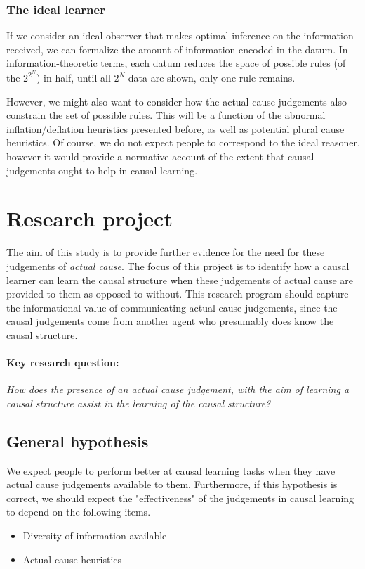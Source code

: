 \documentclass[10pt,letterpaper]{article}
\begin{document}
\subsubsection*{The ideal learner}

If we consider an ideal observer that makes optimal inference on the
information received, we can formalize the amount of information encoded in the
datum. In information-theoretic terms, each datum reduces the space of possible
rules (of the $2^{2^N}$) in half, until all $2^N$ data are shown, only one rule
remains.

However, we might also want to consider how the actual cause judgements also constrain the set of possible rules. This will be a function of the abnormal inflation/deflation heuristics presented before, as well as potential plural cause heuristics.
Of course, we do not expect people to correspond to the ideal reasoner, however it would provide a normative account of the extent that causal judgements ought to help in causal learning.

\section*{Research project}

The aim of this study is to provide further evidence for the need for these judgements of \textit{actual cause}.
The focus of this project is to identify how a causal learner can learn the causal structure when these judgements of actual cause are provided to them as opposed to without. 
This research program should capture the informational value of communicating actual cause judgements, since the causal judgements come from another agent who presumably does know the causal structure.

\paragraph{Key research question:}
\textit{How does the presence of an actual cause judgement, with the aim of learning a causal structure assist in the learning of the causal structure?
}

\subsection*{General hypothesis}

We expect people to perform better at causal learning tasks when they have actual cause judgements available to them.
Furthermore, if this hypothesis is correct, we should expect the "effectiveness" of the judgements in causal learning to depend on the following items.
\begin{itemize}
  \item Diversity of information available
  \item Actual cause heuristics
\end{itemize}
\end{document}
